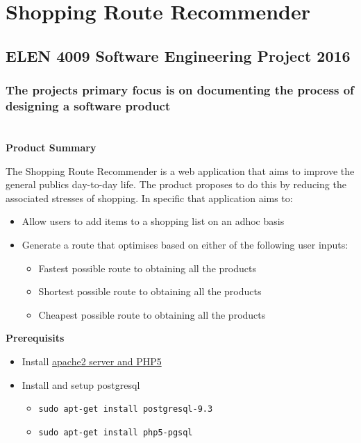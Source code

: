 \documentclass[]{article}
\date{}
\providecommand{\tightlist}{%
  \setlength{\itemsep}{0pt}\setlength{\parskip}{0pt}}
\begin{document}
\section{Shopping Route Recommender}\label{shopping-route-recommender}

\subsection{ELEN 4009 Software Engineering Project
2016}\label{elen-4009-software-engineering-project-2016}

\subsubsection{The projects primary focus is on documenting the process
of designing a software
product}\label{the-projects-primary-focus-is-on-documenting-the-process-of-designing-a-software-product}

\section{}\label{section}

\textbf{Product Summary}

The Shopping Route Recommender is a web application that aims to improve
the general publics day-to-day life. The product proposes to do this by
reducing the associated stresses of shopping. In specific that
application aims to:

\begin{itemize}
\tightlist
\item
  Allow users to add items to a shopping list on an adhoc basis
\item
  Generate a route that optimises based on either of the following user
  inputs:

  \begin{itemize}
  \tightlist
  \item
    Fastest possible route to obtaining all the products
  \item
    Shortest possible route to obtaining all the products
  \item
    Cheapest possible route to obtaining all the products
  \end{itemize}
\end{itemize}

\textbf{Prerequisits}

\begin{itemize}
\tightlist
\item
  Install
  \href{http://www.howtogeek.com/howto/ubuntu/installing-php5-and-apache-on-ubuntu/}{apache2
  server and PHP5}
\item
  Install and setup postgresql

  \begin{itemize}
  \tightlist
  \item
    \texttt{sudo\ apt-get\ install\ postgresql-9.3}
  \item
    \texttt{sudo\ apt-get\ install\ php5-pgsql}
  \end{itemize}
\end{itemize}
\end{document}
